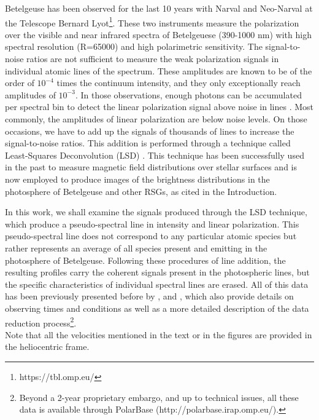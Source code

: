 \documentclass{aa}
\begin{document}
Betelgeuse has been observed for the last 10 years with Narval and Neo-Narval at the Telescope Bernard Lyot\footnote[1]{https://tbl.omp.eu/}. These two instruments measure the polarization 
over the visible and near infrared spectra of Betelgeuese (390-1000 nm) with high spectral resolution (R=65000) and high polarimetric sensitivity. The signal-to-noise ratios are not sufficient to measure the weak polarization signals in individual atomic lines of the 
spectrum. These amplitudes are known to be of the order of $10^{-4}$ times the continuum intensity, and they only exceptionally reach amplitudes of $10^{-3}$. In those observations, enough photons can be accumulated per spectral bin to 
detect the linear polarization signal above noise in lines \citep{auriere_discovery_2016}. Most commonly, the amplitudes of linear polarization are below noise levels. On those 
occasions, we have to add up the signals of thousands of lines to increase the signal-to-noise ratios. This addition 
is performed through a technique called Least-Squares Deconvolution (LSD) \citep{donati_spectropolarimetric_1997}.%
This technique has been successfully used in the past to measure 
magnetic field distributions over stellar surfaces and is now employed to produce images of the brightness distributions in the photosphere 
of Betelgeuse and other RSGs, as cited in the Introduction. 

In this work, we shall examine the signals produced through the LSD technique, which produce a pseudo-spectral line in intensity 
and linear polarization. This pseudo-spectral line does not correspond to any particular atomic species but rather represents an average of all species present and emitting in the 
photosphere of Betelgeuse. Following these procedures of line addition, the resulting profiles carry the coherent signals present in the photospheric lines, but the specific characteristics of individual spectral lines are erased. All of this data has been previously presented before by \cite{auriere_discovery_2016}, \cite{mathias_evolution_2018} and 
\cite{lopez_ariste_three-dimensional_2022}, which also provide details on observing times and conditions as well as a more detailed description 
of the data reduction process\footnote[2]{Beyond a 2-year proprietary embargo, and up to technical issues, all these data is available through 
PolarBase (http://polarbase.irap.omp.eu/).}.\\
Note that all the velocities mentioned in the text or in the figures are provided in the heliocentric frame.
\end{document}
